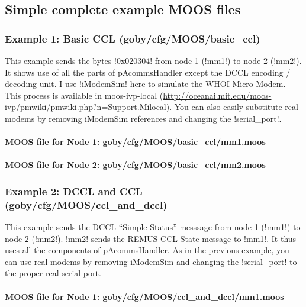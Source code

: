 \subsection{Simple complete example MOOS files}

\subsubsection{Example 1: Basic CCL (goby/cfg/MOOS/basic\_ccl)}\label{sec:moos_example_1}
This example sends the bytes !0x020304! from node 1 (!mm1!) to node 2 (!mm2!). It shows use of all the parts of pAcommsHandler except the DCCL encoding / decoding unit. I use !iModemSim! here to simulate the WHOI Micro-Modem. This process is available in moos-ivp-local (\url{http://oceanai.mit.edu/moos-ivp/pmwiki/pmwiki.php?n=Support.Milocal}). You can also easily substitute real modems by removing iModemSim references and changing the !serial_port!.

\paragraph{MOOS file for Node 1: goby/cfg/MOOS/basic\_ccl/mm1.moos}
\resetbvlinenumber

\paragraph{MOOS file for Node 2: goby/cfg/MOOS/basic\_ccl/mm2.moos}
\resetbvlinenumber

\subsubsection{Example 2: DCCL and CCL (goby/cfg/MOOS/ccl\_and\_dccl)}
This example sends the DCCL ``Simple Status'' messsage from node 1 (!mm1!) to node 2 (!mm2!). !mm2! sends the REMUS CCL State message to !mm1!. It thus uses all the components of pAcommsHandler. As in the previous example, you can use real modems by removing iModemSim and changing the !serial_port! to the proper real serial port.

\paragraph{MOOS file for Node 1: goby/cfg/MOOS/ccl\_and\_dccl/mm1.moos}
\resetbvlinenumber

